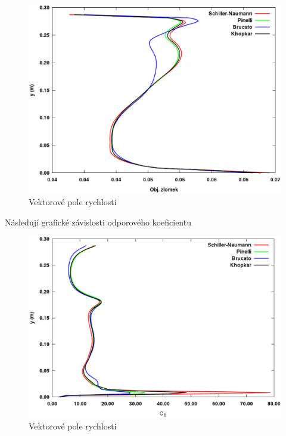 \vspace{-12mm}

\begin{figure}[h!]
\begin{center}
\includegraphics[scale=0.47]{images/Vol-6.eps}
\caption{Vektorové pole rychlosti}
\label{fig:vol6}
\end{center}
\end{figure} 

\vspace{-9mm}

Následují grafické závislosti odporového koeficientu 

\newpage

\begin{figure}[h!]
\begin{center}
\includegraphics[scale=0.47]{images/CD-2.eps}
\caption{Vektorové pole rychlosti}
\label{fig:cd2}
\end{center}
\end{figure} 

